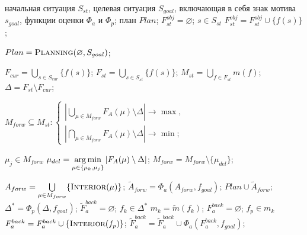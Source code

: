 	\Require начальная ситуация $S_{st}$, целевая ситуация $S_{goal}$, включающая в себя знак мотива $s_{goal}$, функции оценки $\Phi_a$ и $\Phi_p$;
	\Ensure план $Plan$;
	\algrule
	\State $F_{st}^{obj}=\varnothing$; 
	\ForAll $s\in S_{st}$
			\State $F_{st}^{obj}= F_{st}^{obj}\cup\{f(s)\}$; 
		\EndIf
	\EndFor
	
	\State $Plan=\Call{Planning}{\varnothing,S_{goal}}$;
	
		\State $F_{cur}=\bigcup\limits_{s\in S_{cur}}\{f(s)\}$; 
		\State $F_{st}=\bigcup\limits_{s\in S_{st}}\{f(s)\}$; 
		\State $M_{st}=\bigcup\limits_{f\in F_{st}}m(f)$;
		\State $\Delta=F_{st}\setminus F_{cur}$; 
		
		\State $M_{forw}\subseteq M_{st}:\begin{cases}
			|\bigcup\limits_{\mu\in M_{forw}}F_A(\mu)\setminus\Delta|\rightarrow\max,\\
			|\bigcap\limits_{\mu\in M_{forw}}F_A(\mu)\setminus\Delta|\rightarrow\min;
		\end{cases}$ 
		
		\ForAll $\mu_j\in M_{forw}$
				\State $\mu_{del}=\operatorname*{arg\,min}\limits_{\mu\in\{\mu_k,\mu_j\}}|F_A(\mu)\setminus\Delta|$;
				\State $M_{forw}= M_{forw}\setminus\{\mu_{del}\}$; 
			\EndIf
		\EndFor
		
		\State $A_{forw} = \bigcup\limits_{\mu\in M_{forw}}\{\Call{Interior}{\mu}\}$; 
		\State $\tilde A_{forw}=\Phi_a(A_{forw},f_{goal})$; 
			\State \Return $Plan\cup{\tilde A_{forw}}$;		
		\Else
			\State $\Delta^* = \Phi_p(\Delta, f_{goal})$; 
			\State $\tilde F_a^{back} = \varnothing$; 
			\ForAll $f_k\in\Delta^*$ 
				\State $m_k = \tilde m(f_k)$; 
				\State $F_a^{back} = \varnothing$;
				\ForAll $f_p\in m_k$
					\State $F_a^{back}=F_a^{back}\cup\{\Call{Interior}{f_p}\}$;
				\EndFor 
				\State $\tilde F_a^{back}=\tilde F_a^{back}\cup\Phi_a(F_a^{back}, f_{goal})$; 
			\EndFor
			
